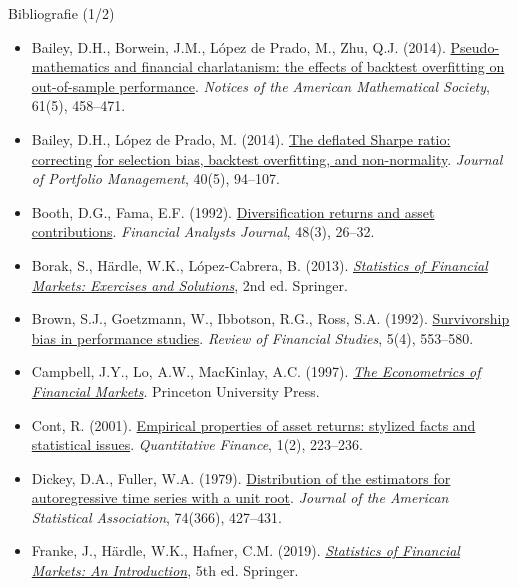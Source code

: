 \begin{frame}{Bibliografie (1/2)}
\itemsize{\tiny}
\begin{itemize}
    \item Bailey, D.H., Borwein, J.M., López de Prado, M., Zhu, Q.J. (2014). \href{https://doi.org/10.1090/noti1105}{Pseudo-mathematics and financial charlatanism: the effects of backtest overfitting on out-of-sample performance}. \textit{Notices of the American Mathematical Society}, 61(5), 458--471.
    \item Bailey, D.H., López de Prado, M. (2014). \href{https://doi.org/10.3905/jpm.2014.40.5.094}{The deflated Sharpe ratio: correcting for selection bias, backtest overfitting, and non-normality}. \textit{Journal of Portfolio Management}, 40(5), 94--107.
    \item Booth, D.G., Fama, E.F. (1992). \href{https://doi.org/10.2469/faj.v48.n3.26}{Diversification returns and asset contributions}. \textit{Financial Analysts Journal}, 48(3), 26--32.
    \item Borak, S., Härdle, W.K., López-Cabrera, B. (2013). \href{https://doi.org/10.1007/978-3-642-33929-5}{\textit{Statistics of Financial Markets: Exercises and Solutions}}, 2nd ed. Springer.
    \item Brown, S.J., Goetzmann, W., Ibbotson, R.G., Ross, S.A. (1992). \href{https://doi.org/10.1093/rfs/5.4.553}{Survivorship bias in performance studies}. \textit{Review of Financial Studies}, 5(4), 553--580.
    \item Campbell, J.Y., Lo, A.W., MacKinlay, A.C. (1997). \href{https://doi.org/10.1515/9781400830213}{\textit{The Econometrics of Financial Markets}}. Princeton University Press.
    \item Cont, R. (2001). \href{https://doi.org/10.1080/713665670}{Empirical properties of asset returns: stylized facts and statistical issues}. \textit{Quantitative Finance}, 1(2), 223--236.
    \item Dickey, D.A., Fuller, W.A. (1979). \href{https://doi.org/10.1080/01621459.1979.10482531}{Distribution of the estimators for autoregressive time series with a unit root}. \textit{Journal of the American Statistical Association}, 74(366), 427--431.
    \item Franke, J., Härdle, W.K., Hafner, C.M. (2019). \href{https://doi.org/10.1007/978-3-030-13751-9}{\textit{Statistics of Financial Markets: An Introduction}}, 5th ed. Springer.
\end{itemize}
\end{frame}

